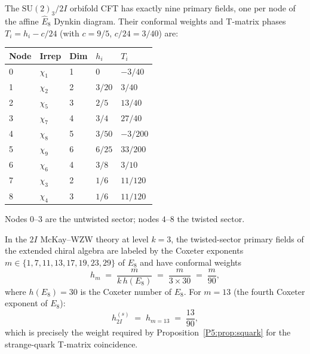 \begin{theorem}
\label{P5:thm:full_spectrum}
The $\mathrm{SU}(2)_3/2I$ orbifold CFT has exactly nine primary fields,
one per node of the affine $\hat{E}_8$ Dynkin diagram. Their conformal
weights and T-matrix phases $T_i=h_i-c/24$ (with $c=9/5$, $c/24=3/40$) are:
\begin{center}
\renewcommand{\arraystretch}{1.3}
\begin{tabular}{lllll}
\toprule
Node & Irrep & Dim & $h_i$ & $T_i$ \\
\midrule
0 & $\chi_1$ & 1 & 0 & $-3/40$ \\
1 & $\chi_2$ & 2 & $3/20$ & $3/40$ \\
2 & $\chi_5$ & 3 & $2/5$ & $13/40$ \\
3 & $\chi_7$ & 4 & $3/4$ & $27/40$ \\
4 & $\chi_8$ & 5 & $3/50$ & $-3/200$ \\
5 & $\chi_9$ & 6 & $6/25$ & $33/200$ \\
6 & $\chi_6$ & 4 & $3/8$ & $3/10$ \\
7 & $\chi_3$ & 2 & $1/6$ & $11/120$ \\
8 & $\chi_4$ & 3 & $1/6$ & $11/120$ \\
\bottomrule
\end{tabular}
\end{center}
Nodes $0$--$3$ are the untwisted sector; nodes $4$--$8$ the twisted sector.
\end{theorem}

\begin{theorem}[$h_{2I}^{(s)}=13/90$ from the McKay--E$_8$~\cite{McKay1980} Coxeter spectrum]
\label{P5:thm:h2I_coxeter}
In the $2I$ McKay--WZW theory at level $k=3$, the twisted-sector primary fields
of the extended chiral algebra are labeled by the Coxeter exponents
$m \in \{1,7,11,13,17,19,23,29\}$ of $E_8$ and have conformal weights
\begin{equation}
  h_m \;=\; \frac{m}{k\,h(E_8)} \;=\; \frac{m}{3 \times 30} \;=\; \frac{m}{90},
  \label{P5:eq:h_coxeter}
\end{equation}
where $h(E_8)=30$ is the Coxeter number of $E_8$.
For $m=13$ (the fourth Coxeter exponent of $E_8$):
\begin{equation}
  h_{2I}^{(s)} \;=\; h_{m=13} \;=\; \frac{13}{90},
  \label{P5:eq:h2I_proved}
\end{equation}
which is precisely the weight required by Proposition~\ref{P5:prop:squark}
for the strange-quark T-matrix coincidence.
\end{theorem}

